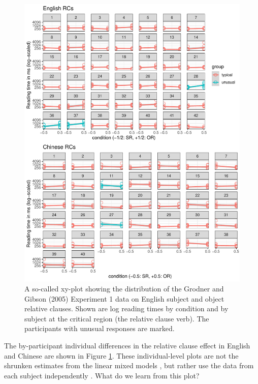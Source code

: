 \documentclass{ar-1col}\usepackage[]{graphicx}\usepackage[]{color}
\makeatletter
\def\maxwidth{ %
  \ifdim\Gin@nat@width>\linewidth
    \linewidth
  \else
    \Gin@nat@width
  \fi
}
\newenvironment{knitrout}{}{} %
\makeatother
\begin{document}
\begin{figure}[!htbp]
\centering
\begin{knitrout}
\color{fgcolor}

{\centering \includegraphics[width=\maxwidth]{figures/fig-unnamed-chunk-14-1} 

}


\end{knitrout}
\caption{A so-called xy-plot showing the distribution of the Grodner and Gibson (2005) Experiment 1 data on English subject and object relative clauses. Shown are log reading times by condition and by subject at the critical region (the relative clause verb). The participants with unusual responses are marked.}\label{fig:xyplot}
\end{figure}

The by-participant individual differences in the relative clause effect in English and Chinese are shown in Figure \ref{fig:xyplot}. These individual-level plots are not the shrunken estimates from the linear mixed models \citep{lme4new}, but rather use the data from each subject independently \citep[from the so-called no-pooling model, ][]{gelmanhill07,VasishthEtAlFreq2019,NicenboimEtAlBayes2019}. What do we learn from this plot?
\end{document}
